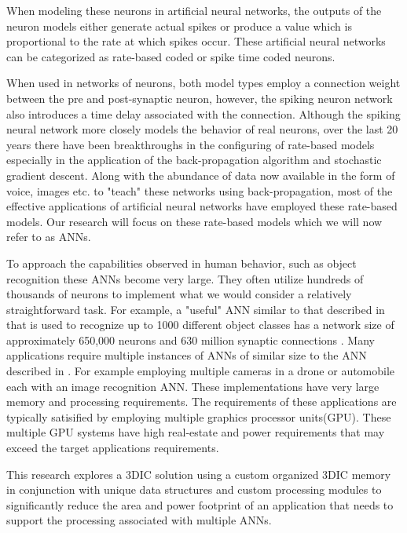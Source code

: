 When modeling these neurons in artificial neural networks, the outputs of the neuron models either generate actual spikes or
produce a value which is proportional to the rate at which spikes occur.
These artificial neural networks can be categorized as rate-based coded or spike time coded neurons.

When used in networks of neurons, both model types employ a connection weight between the pre and post-synaptic neuron, however, the
spiking neuron network also introduces a time delay associated with the connection.
Although the spiking neural network more closely models the behavior of real neurons, over the last 20 years there 
have been breakthroughs in the configuring of rate-based models especially in the application of the back-propagation
algorithm and stochastic gradient descent. Along with the abundance of data now available in the form of voice, images etc. to "teach" these networks
using back-propagation, most of the effective applications of artificial neural networks have employed these rate-based models.
Our research will focus on these rate-based models which we will now refer to as ANNs.
\fi

To approach the capabilities observed in human behavior, such as object recognition these ANNs become very large.
They often utilize hundreds of thousands of neurons to implement what we would consider a relatively straightforward task.
For example, a "useful" ANN similar to that described in \cite{krizhevsky2012imagenet} that is used
to recognize up to 1000 different object classes has a network size of approximately 650,000 neurons and 
630 million synaptic connections \cite{krizhevsky2012imagenetPreso}. 
Many applications require multiple instances of ANNs of similar size to the ANN described in \cite{krizhevsky2012imagenet}.
For example employing multiple cameras in a drone or automobile each with an image recognition ANN\cite{krizhevsky2012imagenet}\cite{bojarski2016end}.
These implementations have very large memory and processing requirements.
The requirements of these applications are typically satisified by employing multiple graphics processor units(GPU).
These multiple GPU systems have high real-estate and power requirements that may exceed the target applications requirements.

This research explores a 3DIC solution using a custom organized 3DIC memory in conjunction with unique data structures and custom processing modules to significantly reduce the 
area and power footprint of an application that needs to support the processing associated with multiple ANNs.


